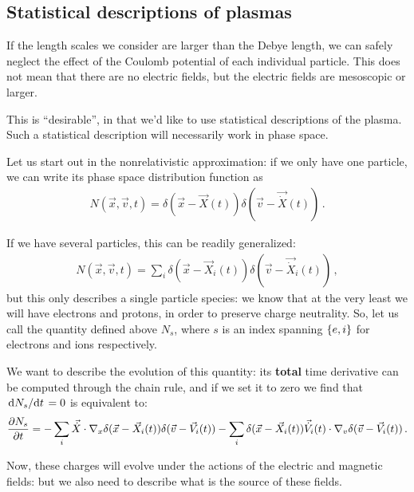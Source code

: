 \documentclass[main.tex]{subfiles}
\begin{document}
\subsection{Statistical descriptions of plasmas}


If the length scales we consider are larger than the Debye length, we can safely neglect the effect of the Coulomb potential of each individual particle. 
This does not mean that there are no electric fields, but the electric fields are mesoscopic or larger. 

This is ``desirable'', in that we'd like to use statistical descriptions of the plasma.
Such a statistical description will necessarily work in phase space. 

Let us start out in the nonrelativistic approximation: if we only have one particle, we can write its phase space distribution function as 
%
\begin{align}
N(\vec{x}, \vec{v}, t) = \delta (\vec{x} - \vec{X}(t)) \delta (\vec{v} - \vec{\dot{X}}(t))
\,.
\end{align}

If we have several particles, this can be readily generalized: 
%
\begin{align}
N(\vec{x}, \vec{v}, t) =
\sum _{i} \delta (\vec{x} - \vec{X}_i(t)) \delta (\vec{v} - \vec{\dot{X}}_i(t))
\,,
\end{align}
%
but this only describes a single particle species: we know that at the very least we will have electrons and protons, in order to preserve charge neutrality. 
So, let us call the quantity defined above \(N_s\), where \(s\) is an index spanning \(\qty{e, i}\) for electrons and ions respectively. 

We want to describe the evolution of this quantity: its \textbf{total} time derivative can be computed through the chain rule, and if we set it to zero we find that \(\dv*{N_s}{t} = 0\) is equivalent to:
%
\begin{align}
\pdv{N_s}{t} (\vec{x}, \vec{v}, t) = 
- \sum _{i} 
\vec{\dot{X}} \cdot
\nabla_x \delta (\vec{x} - \vec{X}_i(t)) 
\delta (\vec{v} - \vec{V}_i (t) ) 
- \sum _{i} 
\delta (\vec{x} - \vec{X}_i(t)) 
\vec{\dot{V}}_i(t) \cdot
\nabla_v \delta (\vec{v} - \vec{V}_i(t)) 
\,.
\end{align}

Now, these charges will evolve under the actions of the electric and magnetic fields: but we also need to describe what is the source of these fields. 
\end{document}
